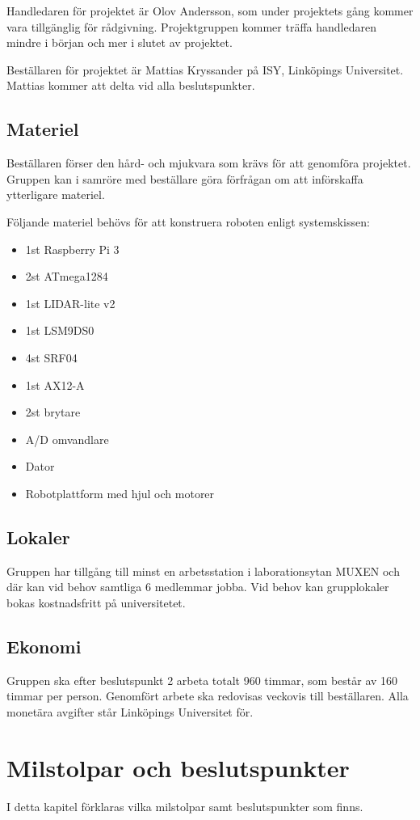 \documentclass[a4paper,11pt]{article}
\newcommand{\LIPShandledare}{Olov Andersson}
\begin{document}
Handledaren för projektet är \LIPShandledare , som under projektets gång kommer vara tillgänglig för rådgivning. Projektgruppen kommer träffa handledaren mindre i början och mer i slutet av projektet.

Beställaren för projektet är  Mattias Kryssander på ISY, Linköpings Universitet. Mattias kommer att delta vid alla beslutspunkter.

\subsection{Materiel}
Beställaren förser den hård- och mjukvara som krävs för att genomföra projektet. Gruppen kan i samröre med beställare göra förfrågan om att införskaffa ytterligare materiel. 

Följande materiel behövs för att konstruera roboten enligt systemskissen:
\begin{itemize}
	\item 1st Raspberry Pi 3
	\item 2st ATmega1284
	\item 1st LIDAR-lite v2
	\item 1st LSM9DS0
	\item 4st SRF04
	\item 1st AX12-A
	\item 2st brytare
	\item A/D omvandlare
	\item Dator
	\item Robotplattform med hjul och motorer
\end{itemize}

\subsection{Lokaler}
Gruppen har tillgång till minst en arbetsstation i laborationsytan MUXEN och där kan vid behov samtliga 6 medlemmar jobba. Vid behov kan grupplokaler bokas kostnadsfritt på universitetet.

\subsection{Ekonomi}
Gruppen ska efter beslutspunkt 2 arbeta totalt 960 timmar, som består av 160 timmar per person. Genomfört arbete ska redovisas veckovis till beställaren. Alla monetära avgifter står Linköpings Universitet för.

\section{Milstolpar och beslutspunkter}
I detta kapitel förklaras vilka milstolpar samt beslutspunkter som finns.
\end{document}
